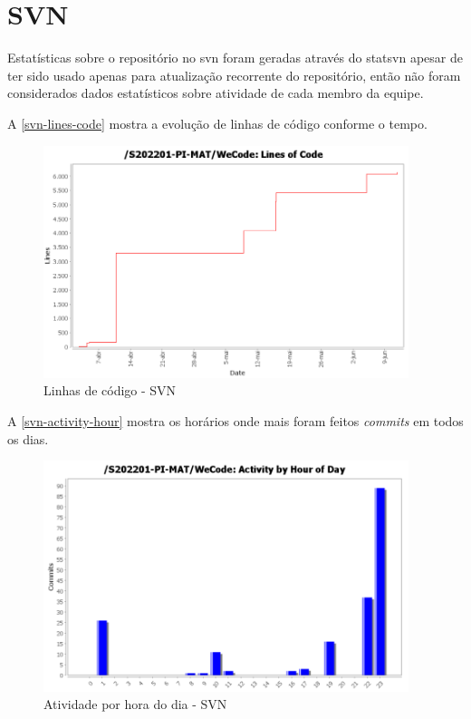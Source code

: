 \section{SVN}
Estatísticas sobre o repositório no \gls{svn} foram geradas através do \gls{statsvn} apesar de ter sido usado apenas para atualização recorrente do repositório, então não foram considerados dados estatísticos sobre atividade de cada membro da equipe.

A \autoref{svn-lines-code} mostra a evolução de linhas de código conforme o tempo.
\begin{figure}[H]
	\centering
	\caption{\label{svn-lines-code}Linhas de código - SVN}
	\includegraphics[width=0.95\textwidth]{../imagens/stats/svn-lines-code.png}
\end{figure}

A \autoref{svn-activity-hour} mostra os horários onde mais foram feitos \textit{commits} em todos os dias.
\begin{figure}[H]
	\centering
	\caption{\label{svn-activity-hour}Atividade por hora do dia - SVN}
	\includegraphics[width=0.95\textwidth]{../imagens/stats/svn-activity-hour.png}
\end{figure}

